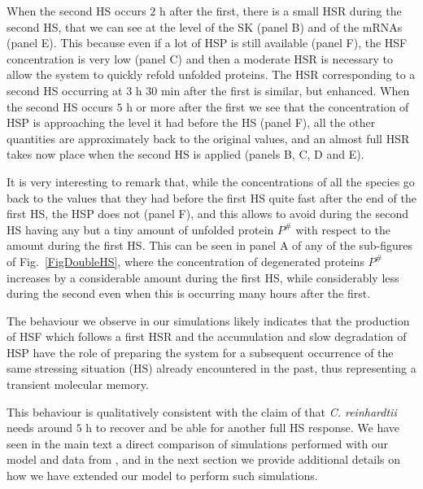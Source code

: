 \documentclass[oneside, 10pt, a4paper, twocolumn]{article}
\begin{document}
When the second HS occurs $2$ h after the first, there is a small HSR during the second HS, that we can see at the level of the SK (panel B) and of the mRNAs (panel E). This because even if a lot of HSP is still available (panel F), the HSF concentration is very low (panel C) and then a moderate HSR is necessary to allow the system to quickly refold unfolded proteins. 
The HSR corresponding to a second HS occurring at $3$ h $30$ min after the first is similar, but enhanced. 
When the second HS occurs $5$ h or more after the first we see that the concentration of HSP is approaching the level it had before the HS (panel F), all the other quantities are approximately back to the original values, and an almost full HSR takes now place when the second HS is applied (panels B, C, D and E). 

It is very interesting to remark that, while the concentrations of all the species go back to the values that they had before the first HS quite fast after the end of the first HS, the HSP does not (panel F), and this allows to avoid during the second HS having any but a tiny amount of unfolded protein $P^\#$ with respect to the amount during the first HS. This can be seen in panel A of any of the sub-figures of Fig.~\ref{FigDoubleHS}, where the concentration of degenerated proteins $P^\#$ increases by a considerable amount during the first HS, while considerably less during the second even when this is occurring many hours after the first. %

The behaviour we observe in our simulations likely indicates that the production of HSF which follows a first HSR and the accumulation and slow degradation of HSP have the role of preparing the system for a subsequent occurrence of the same stressing situation (HS) already encountered in the past, thus representing a transient molecular memory. 

This behaviour is qualitatively consistent with the claim of \cite{Schroda2000} that \emph{C. reinhardtii} needs around $5$ h to recover and be able for another full HS response. We have seen in the main text a direct comparison of simulations performed with our model and data from \cite{Schroda2000}, and in the next section we provide additional details on how we have extended our model to perform such simulations.
\end{document}
